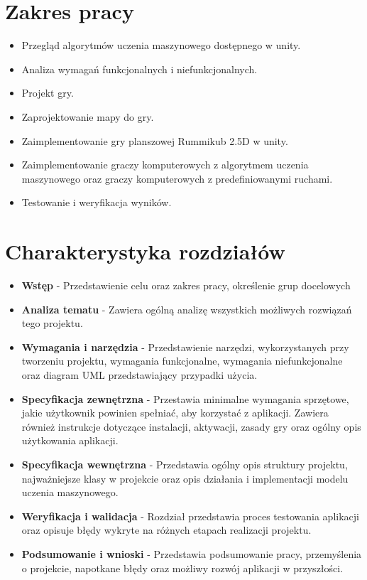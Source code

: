 \documentclass[a4paper,twoside,12pt]{book}
\begin{document}
	\section{Zakres pracy}
	
	\begin{itemize}
		\item Przegląd algorytmów uczenia maszynowego dostępnego w unity.
		\item Analiza wymagań funkcjonalnych i niefunkcjonalnych.
		\item Projekt gry.
		\item Zaprojektowanie mapy do gry.
		\item Zaimplementowanie gry planszowej Rummikub 2.5D w unity.
		\item Zaimplementowanie graczy komputerowych z algorytmem uczenia maszynowego oraz graczy komputerowych z predefiniowanymi ruchami.
		\item Testowanie i weryfikacja wyników.
	\end{itemize} 
	
	\section{Charakterystyka rozdziałów}
	\begin{itemize}
		\item \textbf{Wstęp} - Przedstawienie celu oraz zakres pracy, określenie grup docelowych
		\item \textbf{Analiza tematu} - Zawiera ogólną analizę wszystkich możliwych rozwiązań tego projektu.
		\item  \textbf{Wymagania i narzędzia} - Przedstawienie narzędzi, wykorzystanych przy tworzeniu projektu, wymagania funkcjonalne, wymagania niefunkcjonalne oraz diagram UML przedstawiający przypadki użycia. 
		\item\textbf{Specyfikacja zewnętrzna} - Przestawia minimalne wymagania sprzętowe, jakie użytkownik powinien spełniać, aby korzystać z aplikacji. Zawiera również instrukcje dotyczące instalacji, aktywacji, zasady gry oraz ogólny opis użytkowania aplikacji.
		\item\textbf{Specyfikacja wewnętrzna} - Przedstawia ogólny opis struktury projektu, najważniejsze klasy w projekcie oraz opis działania i implementacji modelu uczenia maszynowego.
		\item\textbf{Weryfikacja i walidacja} - Rozdział przedstawia proces testowania aplikacji oraz opisuje błędy wykryte na różnych etapach realizacji projektu.
		\item\textbf{Podsumowanie i wnioski} - Przedstawia podsumowanie pracy, przemyślenia o projekcie, napotkane błędy oraz możliwy rozwój aplikacji w przyszłości.
	\end{itemize} 
	
\end{document}
